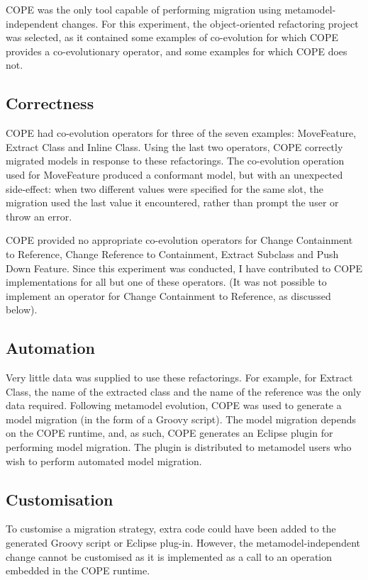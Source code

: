 COPE was the only tool capable of performing migration using metamodel-independent changes. For this experiment, the object-oriented refactoring project was selected, as it contained some examples of co-evolution for which COPE provides a co-evolutionary operator, and some examples for which COPE does not.  

\subsection{Correctness}
COPE had co-evolution operators for three of the seven examples: MoveFeature, Extract Class and Inline Class. Using the last two operators, COPE correctly migrated models in response to these refactorings. The co-evolution operation used for MoveFeature produced a conformant model, but with an unexpected side-effect: when two different values were specified for the same slot, the migration used the last value it encountered, rather than prompt the user or throw an error.

COPE provided no appropriate co-evolution operators for Change Containment to Reference, Change Reference to Containment, Extract Subclass and Push Down Feature. Since this experiment was conducted, I have contributed to COPE implementations for all but one of these operators. (It was not possible to implement an operator for Change Containment to Reference, as discussed below).

\subsection{Automation}
Very little data was supplied to use these refactorings. For example, for Extract Class, the name of the extracted class and the name of the reference was the only data required. Following metamodel evolution, COPE was used to generate a model migration (in the form of a Groovy script). The model migration depends on the COPE runtime, and, as such, COPE generates an Eclipse plugin for performing model migration. The plugin is distributed to metamodel users who wish to perform automated model migration.

\subsection{Customisation}
To customise a migration strategy, extra code could have been added to the generated Groovy script or Eclipse plug-in. However, the metamodel-independent change cannot be customised as it is implemented as a call to an operation embedded in the COPE runtime.

